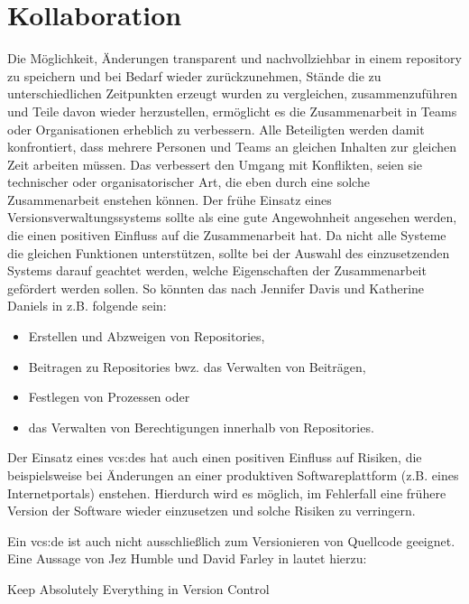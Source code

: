\section{Kollaboration}
Die Möglichkeit, Änderungen transparent und nachvollziehbar in einem
\gls{repository} zu speichern und bei Bedarf wieder zurückzunehmen, Stände die
zu unterschiedlichen Zeitpunkten erzeugt wurden zu vergleichen,
zusammenzuführen und Teile davon wieder herzustellen, ermöglicht es die
Zusammenarbeit in Teams oder Organisationen erheblich zu verbessern. Alle
Beteiligten werden damit konfrontiert, dass mehrere Personen und Teams an
gleichen Inhalten zur gleichen Zeit arbeiten müssen. Das verbessert den Umgang
mit Konflikten, seien sie technischer oder organisatorischer Art, die eben
durch eine solche Zusammenarbeit enstehen können. Der frühe Einsatz eines
Versionsverwaltungssystems sollte als eine gute Angewohnheit angesehen werden,
die einen positiven Einfluss auf die Zusammenarbeit hat. Da nicht alle Systeme
die gleichen Funktionen unterstützen, sollte bei der Auswahl des einzusetzenden
Systems darauf geachtet werden, welche Eigenschaften der Zusammenarbeit
gefördert werden sollen. So könnten das nach Jennifer Davis und Katherine
Daniels in \cite[S.~178]{effdo} z.B. folgende sein:

\begin{itemize}
\item Erstellen und Abzweigen von Repositories,
\item Beitragen zu Repositories bwz. das Verwalten von Beiträgen,
\item Festlegen von Prozessen oder
\item das Verwalten von Berechtigungen innerhalb von Repositories.
\end{itemize}

Der Einsatz eines \glspl{vcs:de} hat auch einen positiven Einfluss auf Risiken,
die beispielsweise bei Änderungen an einer produktiven Softwareplattform (z.B.
eines Internetportals) enstehen. Hierdurch wird es möglich, im Fehlerfall eine
frühere Version der Software wieder einzusetzen und solche Risiken zu
verringern.\cite[S.~178]{effdo}

Ein \acrlong{vcs:de} ist auch nicht ausschließlich zum Versionieren von Quellcode
geeignet. Eine Aussage von Jez Humble und David Farley in \cite[S.~33]{cd}
lautet hierzu:

\begin{center}
\glqq{}Keep Absolutely Everything in Version Control\grqq{}
\end{center}

